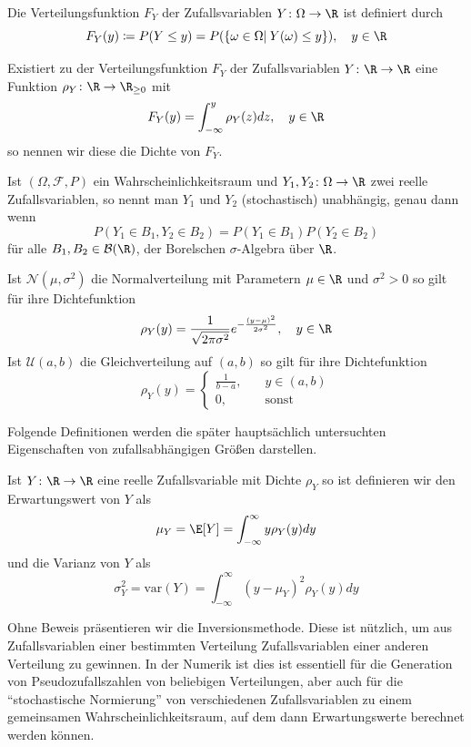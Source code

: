\begin{mathdef}[Verteilungsfunktion]
Die Verteilungsfunktion $F_Y$ der Zufallsvariablen $Y\colon\Omega\to\R$ ist definiert durch
\[F_Y(y)\coloneqq P(Y\le y)=P(\left\lbrace \omega\in\Omega |\: Y(\omega)\le y\right\rbrace),\quad y\in\R\]
\end{mathdef}
\begin{mathdef}
Existiert zu der Verteilungsfunktion $F_Y$ der Zufallsvariablen $Y\colon\R\to\R$ eine Funktion $\rho_Y\colon\R\to\R_{\ge 0}$ mit
\[F_Y(y)=\int_{-\infty}^y\rho_Y(z)dz,\quad y\in\R\]
so nennen wir diese die Dichte von $F_Y$.
\end{mathdef}
\begin{mathdef}
Ist $(\Omega,\mathcal{F},P)$ ein Wahrscheinlichkeitsraum und $Y_1, Y_2\colon \Omega\to\R$ zwei reelle Zufallsvariablen, so nennt man $Y_1$ und $Y_2$ (stochastisch) unabhängig, genau dann wenn
\[P(Y_1\in B_1,Y_2\in B_2)=P(Y_1\in B_1)P(Y_2\in B_2)\]
für alle $B_1,B_2\in \mathcal{B}(\R)$, der Borelschen $\sigma$-Algebra über $\R$.
\end{mathdef}
\begin{mathbsp}
Ist $\mathcal{N}(\mu, \sigma^2)$ die Normalverteilung mit Parametern $\mu\in\R$ und $\sigma^2>0$ so gilt für ihre Dichtefunktion
\[\rho_Y(y)=\frac{1}{\sqrt{2\pi\sigma^2}}e^{-\frac{(y-\mu)^2}{2\sigma^2}},\quad y\in\R\]
Ist $\mathcal{U}(a,b)$ die Gleichverteilung auf $(a,b)$ so gilt für ihre Dichtefunktion
\[\rho_Y(y)=\begin{cases}\frac{1}{b-a},\quad &y\in (a,b)\\ 0, \quad &\text{sonst} \end{cases}\]
\end{mathbsp}
Folgende Definitionen werden die später hauptsächlich untersuchten Eigenschaften von zufallsabhängigen Größen darstellen.
\begin{mathdef}
Ist $Y\colon\R\to\R$ eine reelle Zufallsvariable mit Dichte $\rho_Y$ so ist definieren wir den Erwartungswert von $Y$ als
\[\mu_Y=\E[Y]=\int_{-\infty}^\infty y\rho_Y(y)dy\]
und die Varianz von $Y$ als 
\[\sigma_Y^2=\text{var}(Y)=\int_{-\infty}^\infty (y-\mu_Y)^2\rho_Y(y)dy\]
\end{mathdef}
Ohne Beweis präsentieren wir die Inversionsmethode. Diese ist nützlich, um aus Zufallsvariablen einer bestimmten Verteilung Zufallsvariablen einer anderen Verteilung zu gewinnen. In der Numerik ist dies ist essentiell für die Generation von Pseudozufallszahlen von beliebigen Verteilungen, aber auch für die "`stochastische Normierung"' von verschiedenen Zufallsvariablen zu einem gemeinsamen Wahrscheinlichkeitsraum, auf dem dann Erwartungswerte berechnet werden können.
